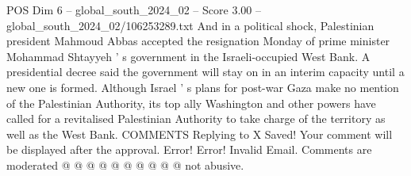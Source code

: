 \begin{textsample}{POS Dim 6 – global\_south\_2024\_02 – Score 3.00 – global\_south\_2024\_02/106253289.txt}
And in a political shock, Palestinian president Mahmoud Abbas accepted the resignation Monday of prime minister Mohammad Shtayyeh ' s government in the Israeli-occupied West Bank.
A presidential decree said the government will stay on in an interim capacity until a new one is formed.
Although Israel ' s plans for post-war Gaza make no mention of the Palestinian Authority, its top ally Washington and other powers have called for a revitalised Palestinian Authority to take charge of the territory as well as the West Bank.
COMMENTS Replying to X Saved!
Your comment will be displayed after the approval.
Error!
Error!
Invalid Email.
Comments are moderated @ @ @ @ @ @ @ @ @ @ not abusive.

\end{textsample}
